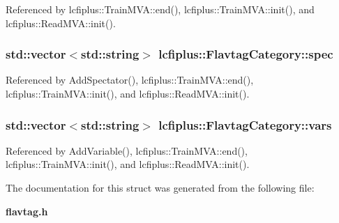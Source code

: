 Referenced by lcfiplus\-::\-Train\-M\-V\-A\-::end(), lcfiplus\-::\-Train\-M\-V\-A\-::init(), and lcfiplus\-::\-Read\-M\-V\-A\-::init().

\subsubsection[{spec}]{\setlength{\rightskip}{0pt plus 5cm}std\-::vector$<$std\-::string$>$ lcfiplus\-::\-Flavtag\-Category\-::spec}\label{structlcfiplus_1_1FlavtagCategory_a5d70094f45fcd7b7ae75d9ec2f309948}


Referenced by Add\-Spectator(), lcfiplus\-::\-Train\-M\-V\-A\-::end(), lcfiplus\-::\-Train\-M\-V\-A\-::init(), and lcfiplus\-::\-Read\-M\-V\-A\-::init().

\subsubsection[{vars}]{\setlength{\rightskip}{0pt plus 5cm}std\-::vector$<$std\-::string$>$ lcfiplus\-::\-Flavtag\-Category\-::vars}\label{structlcfiplus_1_1FlavtagCategory_a00016d50d6a8a41b087a55083e0e5be6}


Referenced by Add\-Variable(), lcfiplus\-::\-Train\-M\-V\-A\-::end(), lcfiplus\-::\-Train\-M\-V\-A\-::init(), and lcfiplus\-::\-Read\-M\-V\-A\-::init().



The documentation for this struct was generated from the following file\-:\begin{DoxyCompactItemize}
\item 
{\bf flavtag.\-h}\end{DoxyCompactItemize}
